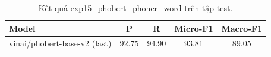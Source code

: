 \begin{table}[t]
\centering
\begin{tabular}{lcccc}
\hline
\textbf{Model} & \textbf{P} & \textbf{R} & \textbf{Micro-F1} & \textbf{Macro-F1} \\
\hline
vinai/phobert-base-v2 (last) & 92.75 & 94.90 & 93.81 & 89.05 \\
\hline
\end{tabular}
\caption{Kết quả exp15_phobert_phoner_word trên tập test.}
\label{tab:main}
\end{table}
